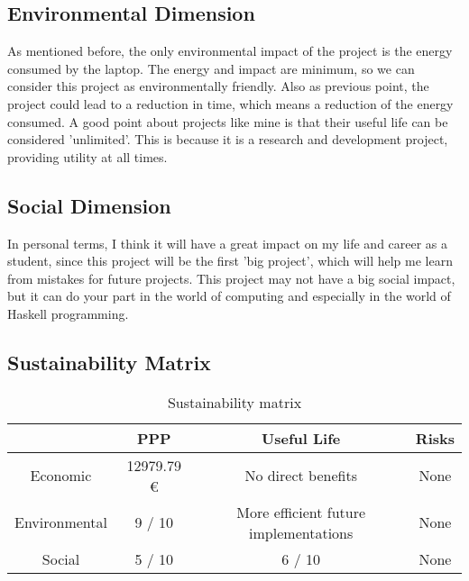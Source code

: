 \subsection{Environmental Dimension}
As mentioned before, the only environmental impact of the project is the energy consumed by the laptop. 
The energy and impact are minimum, so we can consider this project as environmentally friendly.
Also as previous point, the project could lead to a reduction in time, which means a reduction of the energy consumed.
A good point about projects like mine is that their useful life can be considered 'unlimited'.
This is because it is a research and development project, providing utility at all times.
\subsection{Social Dimension}
In personal terms, I think it will have a great impact on my life and career as a student, since this project will be the first 'big project', which will help me learn from mistakes for future projects.
This project may not have a big social impact, but it can do your part in the world of computing and especially in the world of Haskell programming.
\subsection{Sustainability Matrix}
\begin{table}[H]
    \begin{adjustwidth}{-1in}{-1in} %
    \centering
    \begin{tabular}{|c|c|c|c|}
    \hline
    \textbf{} & \textbf{PPP} & \textbf{Useful Life} & \textbf{Risks} \\ 
    \hline
    Economic & 12979.79 € & No direct benefits & None\\
    \hline
    Environmental & 9 / 10 & More efficient future implementations & None\\
    \hline
    Social & 5 / 10 & 6 / 10 & None \\
    \hline
    \end{tabular}
    \caption[{[B\&S] Sustainability Matrix}]{Sustainability matrix}
    \label{sustainability_matrix}
    \end{adjustwidth}
    \end{table}
